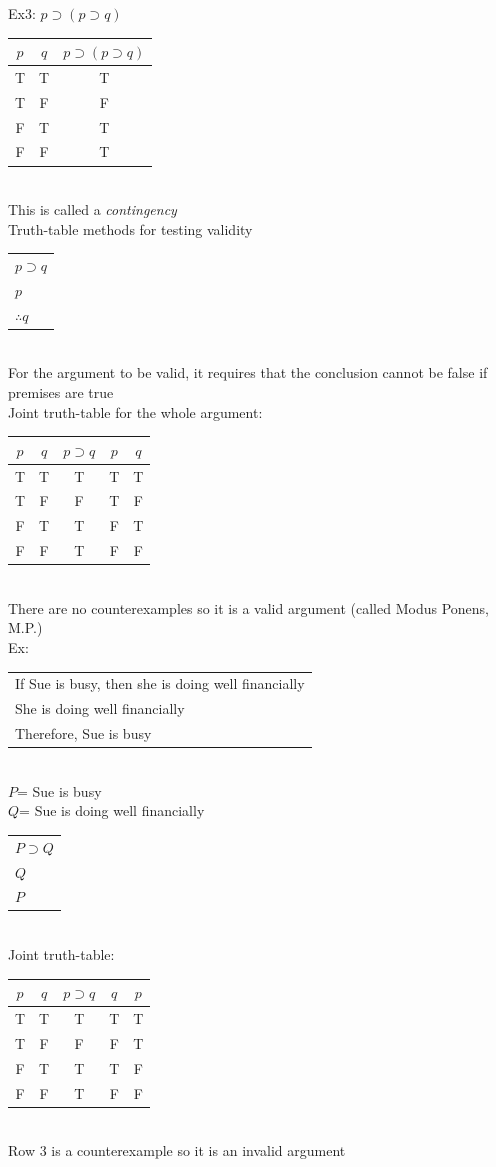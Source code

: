 \documentclass[11pt, fleqn]{article}
\begin{document}
Ex3: $p\supset(p\supset q)$\\
\begin{tabular}{c|c|c}
    $p$ & $q$ & $p\supset(p\supset q)$\\
    \hline
    T & T & T\\
    T & F & F\\
    F & T & T\\
    F & F & T
\end{tabular}\\
This is called a \textit{contingency}\\

Truth-table methods for testing validity\\
\begin{tabular}{p{2cm}}
    $p\supset q$\\
    $p$\\
    \hline
    $\therefore q$
\end{tabular}\\
For the argument to be valid, it requires that the conclusion cannot be false if premises are true\\
Joint truth-table for the whole argument:\\
\begin{tabular}{c|c||c|c||c}
    $p$ & $q$ & $p\supset q$ & $p$ & $q$\\
    \hline
    T & T & T & T & T\\
    T & F & F & T & F\\
    F & T & T & F & T\\
    F & F & T & F & F
\end{tabular}\\
There are no counterexamples so it is a valid argument (called Modus Ponens, M.P.)\\

Ex:\\
\begin{tabular}{p{8cm}}
    If Sue is busy, then she is doing well financially\\
    She is doing well financially\\
    \hline
    Therefore, Sue is busy
\end{tabular}\\
$P$= Sue is busy\\
$Q$= Sue is doing well financially\\
\begin{tabular}{p{2cm}}
    $P\supset Q$\\
    $Q$\\
    \hline
    $P$
\end{tabular}\\
Joint truth-table:\\
\begin{tabular}{c|c||c|c||c}
    $p$ & $q$ & $p\supset q$ & $q$ & $p$\\
    \hline
    T & T & T & T & T\\
    T & F & F & F & T\\
    F & T & T & T & F\\
    F & F & T & F & F
\end{tabular}\\
Row 3 is a counterexample so it is an invalid argument\\
\end{document}
